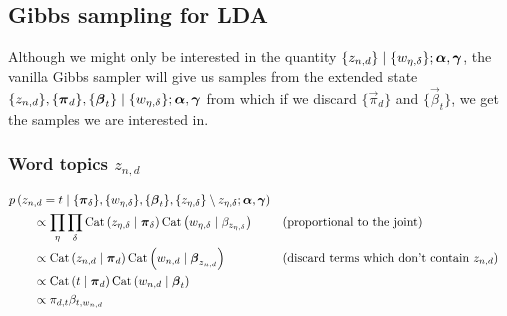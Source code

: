 \subsection{Gibbs sampling for LDA}
Although we might only be interested in the quantity $\{z_{n, d}\} \mid \{w_{\eta, \delta}\}; \boldsymbol{\mathbf{\alpha}}, \boldsymbol{\mathbf{\gamma}}$, the vanilla Gibbs sampler will give us samples from the extended state $\{z_{n, d}\}, \{\boldsymbol{\mathbf{\pi}}_d\}, \{\boldsymbol{\mathbf{\beta}}_t\} \mid \{w_{\eta, \delta}\}; \boldsymbol{\mathbf{\alpha}}, \boldsymbol{\mathbf{\gamma}}$ from which if we discard $\{\vec \pi_d\}$ and $\{\vec \beta_t\}$, we get the samples we are interested in.

\subsubsection{Word topics $z_{n, d}$}
\begin{align}
    \hspace{2em}&\hspace{-2em}
    p\left(z_{n, d} = t \given \{\vec \pi_\delta\}, \{w_{\eta, \delta}\}, \{\vec \beta_t\}, \{z_{\eta, \delta}\} \setminus z_{\eta, \delta}; \vec \alpha, \vec \gamma\right) \nonumber\\
    &\propto \prod_\eta \prod_\delta \Cat\left(z_{\eta, \delta} \given \vec \pi_\delta\right) \Cat\left(w_{\eta, \delta} \given \beta_{z_{\eta, \delta}}\right) && \text{(proportional to the joint)}\nonumber\\
    &\propto \Cat\left(z_{n, d} \given \vec \pi_d\right) \Cat\left(w_{n, d} \given \vec \beta_{z_{n, d}}\right) && \text{(discard terms which don't contain $z_{n, d}$)}\nonumber\\
    &\propto \Cat\left(t \given \vec \pi_d\right) \Cat\left(w_{n, d} \given \vec \beta_t\right) \nonumber\\
    &\propto \pi_{d, t} \beta_{t, w_{n, d}}
\end{align}

